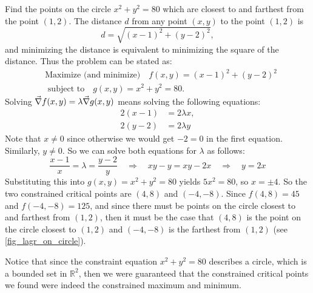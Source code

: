 \begin{example}\label{ex_lagr_circle}%
Find the points on the circle $x^2 + y^2 = 80$ which are closest to and farthest from the point $(1,2)$.
\solution
The distance $d$ from any point $(x,y)$ to the point $(1,2)$ is
  \[d=\sqrt{(x-1)^2 + (y-2)^2},\]
 and minimizing the distance is equivalent to minimizing the square of the distance. Thus the problem can be stated as:
 \begin{align*}
 &\text{Maximize (and minimize)}\quad f(x,y) = (x-1)^2 + (y-2)^2\\
 &\text{ subject to}\quad g(x,y) = x^2 + y^2 = 80.
 \end{align*}
 Solving $\vec\nabla f(x,y) = \lambda \vec\nabla g(x,y)$ means solving the following equations:
 \begin{align*}
  2(x-1) &= 2\lambda x ,\\
  2(y-2) &= 2\lambda y
 \end{align*}
 Note that $x \ne 0$ since otherwise we would get $-2=0$ in the first equation. Similarly, $y \ne 0$. So we can solve both equations for $\lambda$ as follows:
 \[
  \frac{x-1}x=\lambda=\frac{y-2}y\quad\Rightarrow\quad
  xy-y=xy-2x\quad\Rightarrow\quad
  y=2x
 \]
 Substituting this into $g(x,y) = x^2 + y^2 = 80$ yields $5x^2=80$, so $x=\pm 4$. So the two constrained critical points are $(4,8)$ and $(-4,-8)$. Since $f(4,8)=45$ and $f(-4,-8)=125$, and since there must be points on the circle closest to and farthest from $(1,2)$, then it must be the case that $(4,8)$ is the point on the circle closest to $(1,2)$ and $(-4,-8)$ is the farthest from $(1,2)$ (see \autoref{fig_lagr_on_circle}).
 
 Notice that since the constraint equation $x^2 + y^2 = 80$ describes a circle, which is a bounded set in $\mathbb{R}^2$, then we were guaranteed that the constrained critical points we found were indeed the constrained maximum and  minimum.
\end{example}


